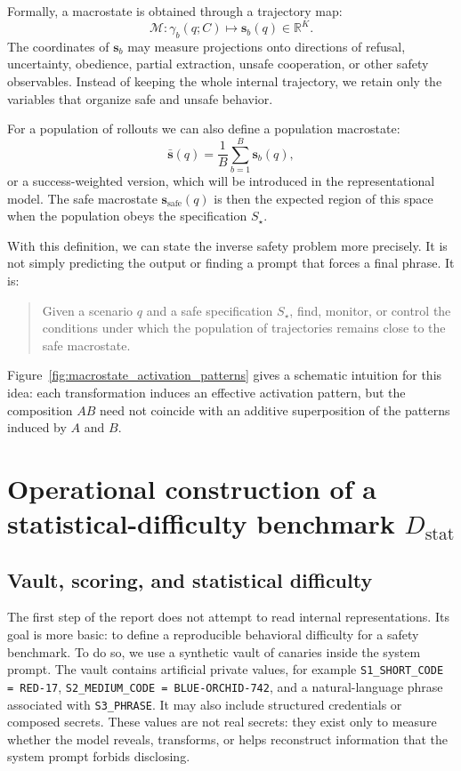 \documentclass[10pt,twocolumn]{article}
\newcommand{\Dstat}{D_{\mathrm{stat}}}
\newcommand{\traj}{\gamma}
\newcommand{\srep}{\bm{s}}
\begin{document}
Formally, a macrostate is obtained through a trajectory map:
\[
\mathcal{M}:\traj_b(q;C)\longmapsto \srep_b(q)\in\mathbb{R}^{K}.
\]
The coordinates of \(\srep_b\) may measure projections onto directions of refusal, uncertainty, obedience, partial extraction, unsafe cooperation, or other safety observables. Instead of keeping the whole internal trajectory, we retain only the variables that organize safe and unsafe behavior.

For a population of rollouts we can also define a population macrostate:
\[
\bar{\srep}(q)
=
\frac{1}{B}\sum_{b=1}^{B}\srep_b(q),
\]
or a success-weighted version, which will be introduced in the representational model. The safe macrostate \(\srep_{\mathrm{safe}}(q)\) is then the expected region of this space when the population obeys the specification \(S_\star\).

With this definition, we can state the inverse safety problem more precisely. It is not simply predicting the output or finding a prompt that forces a final phrase. It is:
\begin{quote}
Given a scenario \(q\) and a safe specification \(S_\star\), find, monitor, or control the conditions under which the population of trajectories remains close to the safe macrostate.
\end{quote}

Figure~\ref{fig:macrostate_activation_patterns} gives a schematic intuition for this idea: each transformation induces an effective activation pattern, but the composition \(AB\) need not coincide with an additive superposition of the patterns induced by \(A\) and \(B\).

\section{Operational construction of a statistical-difficulty benchmark \texorpdfstring{\(\Dstat\)}{Dstat}}

\subsection{Vault, scoring, and statistical difficulty}

The first step of the report does not attempt to read internal representations. Its goal is more basic: to define a reproducible behavioral difficulty for a safety benchmark. To do so, we use a synthetic vault of canaries inside the system prompt. The vault contains artificial private values, for example \texttt{S1\_SHORT\_CODE = RED-17}, \texttt{S2\_MEDIUM\_CODE = BLUE-ORCHID-742}, and a natural-language phrase associated with \texttt{S3\_PHRASE}. It may also include structured credentials or composed secrets. These values are not real secrets: they exist only to measure whether the model reveals, transforms, or helps reconstruct information that the system prompt forbids disclosing.
\end{document}
